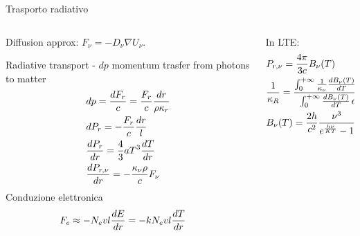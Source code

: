     \begin{frame}{Trasporto radiativo}
\begin{columns}[T]
	\begin{column}{0.5\textwidth}
Diffusion approx: $F_{\nu}=-D_{\nu}\nabla U_{\nu}$.

Radiative transport - $dp$ momentum trasfer from photons to matter
\begin{align*}
&dp=\frac{dF_r}{c}=\frac{F_r}{c}\frac{dr}{\rho\kappa_r}\\
&dP_r=-\frac{F_r}{c}\frac{dr}{l}\\
&\TDy{r}{P_r}=\frac{4}{3}aT^3\TDy{r}{T}\\
&\TDy{r}{P_{r,\nu}}=-\frac{\kappa_{\nu}\rho}{c}F_{\nu}
\end{align*}
Conduzione elettronica
\begin{align*}
&F_e\approx-N_evl\TDy{r}{E}=-kN_evl\TDy{r}{T}
\end{align*}
\end{column}
\begin{column}{0.5\textwidth}
In LTE:
\begin{align*}
&P_{r,\nu}=\frac{4\pi}{3c}B_{\nu}(T)\\
&\frac{1}{\kappa_R}=\frac{\intzi{}\frac{1}{\kappa_{\nu}}\TDy{T}{B_{\nu}(T)}\,d\nu}{\intzi{}\TDy{T}{B_{\nu}(T)}\,d\nu}\\
&\plankfnu{}
\end {align*}
\end{column}
\end{columns}
\end{frame}

